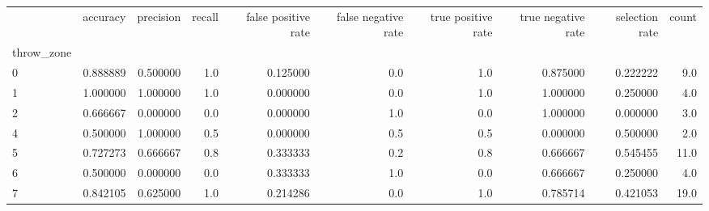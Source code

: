 \begin{tabular}{lrrrrrrrrr}
\toprule
{} &  accuracy &  precision &  recall &  false positive rate &  false negative rate &  true positive rate &  true negative rate &  selection rate &  count \\
throw\_zone &           &            &         &                      &                      &                     &                     &                 &        \\
\midrule
0          &  0.888889 &   0.500000 &     1.0 &             0.125000 &                  0.0 &                 1.0 &            0.875000 &        0.222222 &    9.0 \\
1          &  1.000000 &   1.000000 &     1.0 &             0.000000 &                  0.0 &                 1.0 &            1.000000 &        0.250000 &    4.0 \\
2          &  0.666667 &   0.000000 &     0.0 &             0.000000 &                  1.0 &                 0.0 &            1.000000 &        0.000000 &    3.0 \\
4          &  0.500000 &   1.000000 &     0.5 &             0.000000 &                  0.5 &                 0.5 &            0.000000 &        0.500000 &    2.0 \\
5          &  0.727273 &   0.666667 &     0.8 &             0.333333 &                  0.2 &                 0.8 &            0.666667 &        0.545455 &   11.0 \\
6          &  0.500000 &   0.000000 &     0.0 &             0.333333 &                  1.0 &                 0.0 &            0.666667 &        0.250000 &    4.0 \\
7          &  0.842105 &   0.625000 &     1.0 &             0.214286 &                  0.0 &                 1.0 &            0.785714 &        0.421053 &   19.0 \\
\bottomrule
\end{tabular}
